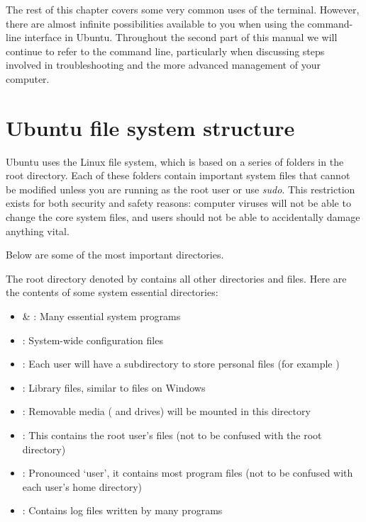 The rest of this chapter covers some very common uses of the terminal. However, there are almost infinite possibilities available to you when using
the command-line interface in Ubuntu. Throughout the second part of this manual we will continue to refer to the command line, particularly when discussing steps involved in troubleshooting and the more advanced management of your computer.


\section{Ubuntu file system structure}

Ubuntu uses the Linux file system, which is based on a series of folders in the root directory. Each of these folders contain important system files that cannot be modified unless you are running as the root user or use \emph{sudo}. This restriction exists for both security and safety reasons: computer viruses will not be able to change the core system files, and users should not be able to accidentally damage anything vital.

Below are some of the most important directories.


The root directory \dash denoted by \code{/} \dash contains all other directories and files. Here are the contents of some system essential directories:

\begin{itemize}
  \item {} \& : Many essential system programs
  \item {}: System-wide configuration files
  \item {}: Each user will have a subdirectory to store personal files (for example )
  \item {}: Library files, similar to  files on Windows
  \item {}: Removable media ( and  drives) will be mounted in this directory
  \item {}: This contains the root user's files (not to be confused with the root directory)
  \item {}: Pronounced `user', it contains most program files (not to be confused with each user's home directory)
  \item {}: Contains log files written by many programs
\end{itemize}

